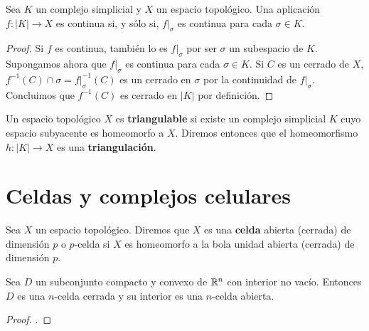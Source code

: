 \begin{lema}
	\label{lem:cont_poly} Sea \(K\) un complejo simplicial y \(X\) un espacio topológico.
	Una aplicación \(f: |K| \rightarrow X\) es continua si, y sólo si, \(f|_{\sigma}\)
	es continua para cada \(\sigma \in K\).
\end{lema}
\begin{proof}
	Si \(f\) es continua, también lo es \(f|_{\sigma}\) por ser \(\sigma\) un subespacio
	de \(K\). Supongamos ahora que \(f|_{\sigma}\) es continua para cada \(\sigma \in K\).
	Si \(C\) es un cerrado de \(X\), \(f^{-1}(C) \cap \sigma = f|_{\sigma}^{-1}(C)\) es un
	cerrado en \(\sigma\) por la continuidad de \(f|_{\sigma}\). Concluimos que
	\(f^{-1}(C)\) es cerrado en \(|K|\) por definición.
\end{proof}
\begin{definicion}
	Un espacio topológico \(X\) es \textbf{triangulable} si existe un complejo
	simplicial \(K\) cuyo espacio subyacente es homeomorfo a \(X\). Diremos entonces que
	el homeomorfismo \(h: |K| \rightarrow X\) es una \textbf{triangulación}.
\end{definicion}

\section{Celdas y complejos celulares}

\begin{definicion}
	Sea \(X\) un espacio topológico. Diremos que \(X\) es una \textbf{celda} abierta (cerrada) 
	de dimensión \(p\) o \(p\)-celda si \(X\) es homeomorfo a la bola unidad abierta (cerrada) de dimensión \(p\).
\end{definicion}

\begin{proposicion}
	\label{prop:compact-convex-closed-cell}
	Sea $D$ un subconjunto compacto y convexo de $\mathbb{R}^n$ con interior no vacío. Entonces $D$ es una $n$-celda cerrada y su interior es una $n$-celda abierta.
\end{proposicion}
\begin{proof}
	.
\end{proof}

